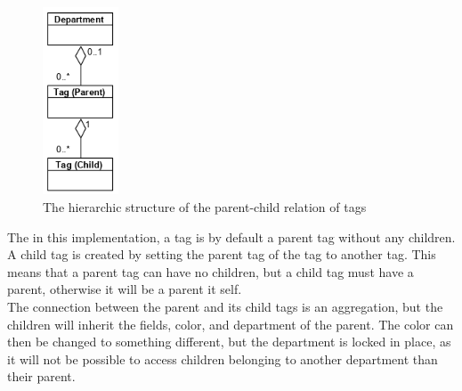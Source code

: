 \begin{figure}[H]
    \centering
    \includegraphics[width=0.2\textwidth]{figures/Implementation/TagHierarchicStructure.png}
    \caption{The hierarchic structure of the parent-child relation of tags}
    \label{fig:TagHierarchicStructureWithDepartment}
\end{figure}

The in this implementation, a tag is by default a parent tag without any children. A child tag is created by setting the parent tag of the tag to another tag. This means that a parent tag can have no children, but a child tag must have a parent, otherwise it will be a parent it self.\\
The connection between the parent and its child tags is an aggregation, but the children will inherit the fields, color, and department of the parent. The color can then be changed to something different, but the department is locked in place, as it will not be possible to access children belonging to another department than their parent.

